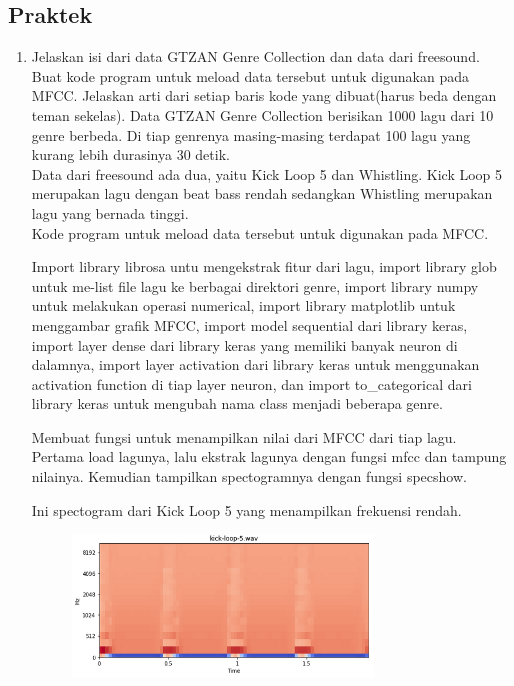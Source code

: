 \subsection{Praktek}
\begin{enumerate}
	\item Jelaskan isi dari data GTZAN Genre Collection dan data dari freesound. Buat kode program untuk meload data tersebut untuk digunakan pada MFCC. Jelaskan arti dari setiap baris kode yang dibuat(harus beda dengan teman sekelas).
	\hfill\break
	Data GTZAN Genre Collection berisikan 1000 lagu dari 10 genre berbeda. Di tiap genrenya masing-masing terdapat 100 lagu yang kurang lebih durasinya 30 detik.\\
	Data dari freesound ada dua, yaitu Kick Loop 5 dan Whistling. Kick Loop 5 merupakan lagu dengan beat bass rendah sedangkan Whistling merupakan lagu yang bernada tinggi.\\
	Kode program untuk meload data tersebut untuk digunakan pada MFCC.
	
	Import library librosa untu mengekstrak fitur dari lagu, import library glob untuk me-list file lagu ke berbagai direktori genre, import library numpy untuk melakukan operasi numerical, import library matplotlib untuk menggambar grafik MFCC, import model sequential dari library keras, import layer dense dari library keras yang memiliki banyak neuron di dalamnya, import layer activation dari library keras untuk menggunakan activation function di tiap layer neuron, dan import to\_categorical dari library keras untuk mengubah nama class menjadi beberapa genre.
	
	Membuat fungsi untuk menampilkan nilai dari MFCC dari tiap lagu. Pertama load lagunya, lalu ekstrak lagunya dengan fungsi mfcc dan tampung nilainya. Kemudian tampilkan spectogramnya dengan fungsi specshow.
	
	Ini spectogram dari Kick Loop 5 yang menampilkan frekuensi rendah.
	\hfill\break
	\begin{figure}[H]
		\includegraphics[width=8cm]{figures/1174006/chapter6/praktek/1-1.png}

\end{figure}
\end{enumerate}
